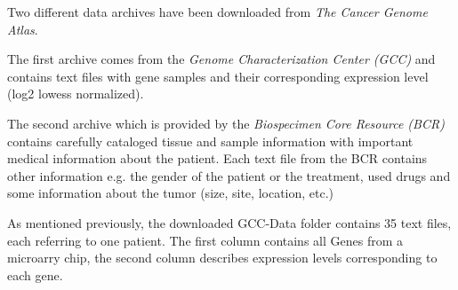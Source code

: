 \documentclass{bioinfo}
\begin{document}
Two different data archives have been downloaded from \emph{The Cancer Genome Atlas}.

The first archive comes from the \emph{Genome Characterization Center (GCC)} and contains text files with gene samples and their corresponding expression level (log2 lowess normalized).

The second archive which is provided by the \emph{Biospecimen Core Resource (BCR)} contains carefully cataloged tissue and sample information with important medical information about the patient. Each text file from the BCR contains other information e.g. the gender of the patient or the treatment, used drugs and some information about the tumor (size, site, location, etc.)

As mentioned previously, the downloaded GCC-Data folder contains 35 text files, each referring to one patient. The first column contains all Genes from a microarry chip, the second column describes expression levels corresponding to each gene.
\end{document}

